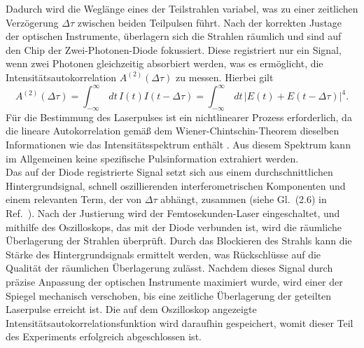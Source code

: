 Dadurch wird die Weglänge eines der Teilstrahlen variabel, was zu einer zeitlichen Verzögerung 
$\Delta\tau$ zwischen beiden Teilpulsen führt. 
Nach der korrekten Justage der optischen Instrumente, überlagern sich die Strahlen räumlich und sind 
auf den Chip der Zwei-Photonen-Diode fokussiert. 
Diese registriert nur ein Signal, wenn zwei Photonen gleichzeitig absorbiert werden, 
was es ermöglicht, die Intensitätsautokorrelation $A^{(2)}(\Delta\tau)$ zu messen. Hierbei gilt
\begin{equation}
    A^{(2)}(\Delta\tau) = \int_{-\infty}^{\infty}\,dt\,I(t)I(t-\Delta\tau) = \int_{-\infty}^{\infty}\,dt\,\left\vert E(t) + E(t-\Delta\tau) \right\vert^{4}.
\end{equation}  
Für die Bestimmung des Laserpulses ist ein nichtlinearer Prozess erforderlich, da die lineare 
Autokorrelation gemäß dem Wiener-Chintschin-Theorem dieselben Informationen wie das Intensitätsspektrum enthält \cite{Anleitung}. 
Aus diesem Spektrum kann im Allgemeinen keine spezifische Pulsinformation extrahiert werden. \\
Das auf der Diode registrierte Signal setzt sich aus einem durchschnittlichen Hintergrundsignal, 
schnell oszillierenden interferometrischen Komponenten und einem relevanten Term, der von $\Delta\tau$ abhängt, 
zusammen (siehe Gl.~(2.6) in Ref.~\cite{Anleitung}). 
Nach der Justierung wird der Femtosekunden-Laser eingeschaltet, und mithilfe des Oszilloskops, 
das mit der Diode verbunden ist, wird die räumliche Überlagerung der Strahlen überprüft. 
Durch das Blockieren des Strahls kann die Stärke des Hintergrundsignals ermittelt werden, 
was Rückschlüsse auf die Qualität der räumlichen Überlagerung zulässt. 
Nachdem dieses Signal durch präzise Anpassung der optischen Instrumente maximiert wurde, 
wird einer der Spiegel mechanisch verschoben, bis eine zeitliche Überlagerung der geteilten Laserpulse 
erreicht ist. 
Die auf dem Oszilloskop angezeigte Intensitätsautokorrelationsfunktion wird daraufhin gespeichert, 
womit dieser Teil des Experiments erfolgreich abgeschlossen ist.\\

